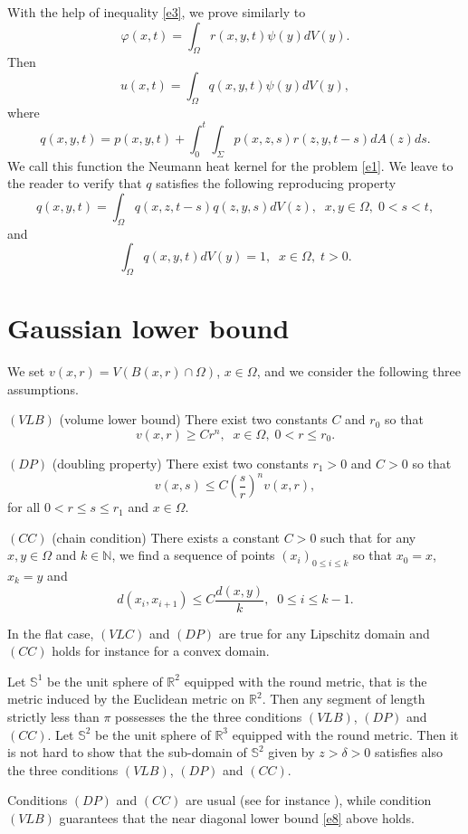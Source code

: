 \documentclass{birkjour}
\begin{document}
With the help of inequality \eqref{e3}, we prove similarly to \cite[(3.6)]{CK}
\[
\varphi (x,t)=\int_\Omega r(x,y,t)\psi (y)dV(y).
\]
Then
\[
u(x,t)=\int_\Omega q(x,y,t)\psi (y) dV(y),
\]
where
\[
q(x,y,t)=p(x,y,t)+\int_0^t\int_\Sigma p(x,z,s)r(z,y,t-s)dA(z)ds.
\]
We call this function the Neumann heat kernel for the problem \eqref{e1}. We leave to the reader to verify that $q$ satisfies the following reproducing property
\[
q(x,y,t)=\int_\Omega q(x,z,t-s)q(z,y,s)dV(z),\;\; x,y\in \Omega ,\; 0<s<t,
\]
and
\[
\int_\Omega q(x,y,t)dV(y)=1,\;\; x\in \Omega ,\; t>0.
\]


\section{Gaussian lower bound}

We set $v(x,r)= V(B(x,r)\cap \Omega )$, $x\in \Omega$, and we consider the following three assumptions.

\smallskip
$(VLB)$ (volume lower bound)  There exist two constants $C$ and $r_0$ so that 
\[
v(x,r)\geq Cr^n,\;\; x\in \Omega ,\; 0<r\leq r_0.
\]

\smallskip
$(DP)$ (doubling property) There exist two constants $r_1>0$ and $C>0$ so that \[ v(x,s)\leq C\left(\frac{s}{r}\right)^nv(x,r), \] for all $0<r\leq s\leq r_1$ and $x\in \Omega$.

\smallskip
$(CC)$ (chain condition) There exists a constant $C>0$ such that for any $x,y\in \Omega$ and $k\in \mathbb{N}$, we find a sequence of points $(x_i)_{0\leq i\leq k}$ so that $x_0=x$, $x_k=y$ and
\[
d(x_i,x_{i+1})\leq C\frac{d(x,y)}{k},\;\; 0\leq i\leq k-1.
\]

In the flat case, $(VLC)$ and $(DP)$ are true for any Lipschitz domain  and $(CC)$ holds for instance for a convex domain.

\smallskip
Let $\mathbb{S}^1$ be the unit sphere of $\mathbb{R}^2$ equipped with the round metric, that is the metric induced by the Euclidean metric on $\mathbb{R}^2$. Then any segment of length strictly less than $\pi$ possesses the the three conditions $(VLB)$, $(DP)$ and $(CC)$. Let $\mathbb{S}^2$ be the unit sphere of $\mathbb{R}^3$ equipped with the round metric. Then it is not hard to show that the sub-domain of $\mathbb{S}^2$ given by $z>\delta >0$ satisfies also the three conditions $(VLB)$, $(DP)$ and $(CC)$.

\smallskip 
Conditions $(DP)$ and $(CC)$ are usual (see for instance \cite[Theorem 7.29, page 248]{Ou}), while condition $(VLB)$ guarantees that the near diagonal lower bound \eqref{e8} above holds. 
\end{document}
